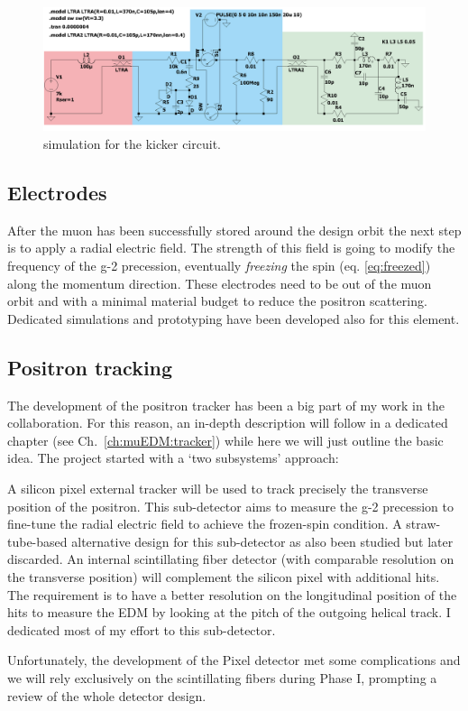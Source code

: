 \begin{refsection}
        \begin{figure}
            \centering
            \includegraphics[width = \textwidth]{Figures/muEDM/CircuitMuonKickerV3_1.png}
            \caption{\ltsp simulation for the kicker circuit.}
            \label{fig:muEDM:kicker:circuit}
        \end{figure}

    \subsection{Electrodes}
        After the muon has been successfully stored around the design orbit the next step is to apply a radial electric field. 
        The strength of this field is going to modify the frequency of the g-2 precession, eventually \textit{freezing} the spin (eq. \ref{eq:freezed}) along the momentum direction.
        These electrodes need to be out of the muon orbit and with a minimal material budget to reduce the positron scattering.  
        Dedicated simulations and prototyping have been developed also for this element.

    \subsection{Positron tracking}
        The development of the positron tracker has been a big part of my work in the collaboration.
        For this reason, an in-depth description will follow in a dedicated chapter (see Ch.~\ref{ch:muEDM:tracker}) while here we will just outline the basic idea.
        The project started with a `two subsystems' approach:
        \begin{outline}
            \1 A silicon pixel external tracker will be used to track precisely the transverse position of the positron. 
            This sub-detector aims to measure the g-2 precession to fine-tune the radial electric field to achieve the frozen-spin condition.
            A straw-tube-based alternative design for this sub-detector as also been studied but later discarded.
            \1 An internal scintillating fiber detector (with comparable resolution on the transverse position) will complement the silicon pixel with additional hits. 
            The requirement is to have a better resolution on the longitudinal position of the hits to measure the EDM by looking at the pitch of the outgoing helical track.
            I dedicated most of my effort to this sub-detector.
        \end{outline}
        Unfortunately, the development of the Pixel detector met some complications and we will rely exclusively on the scintillating fibers during Phase I, prompting a review of the whole detector design.  


\end{refsection}
